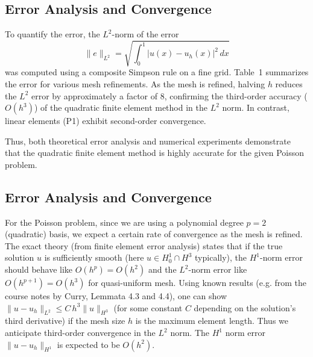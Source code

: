 \documentclass[a4paper,10pt]{article}
\begin{document}
\subsection{Error Analysis and Convergence}
To quantify the error, the \(L^2\)-norm of the error
\[
	\|e\|_{L^2} = \sqrt{\int_0^1 |u(x)-u_h(x)|^2\,dx}
\]
was computed using a composite Simpson rule on a fine grid. Table~1 summarizes the error for various mesh refinements. As the mesh is refined, halving \(h\) reduces the \(L^2\) error by approximately a factor of 8, confirming the third-order accuracy (\(O(h^3)\)) of the quadratic finite element method in the \(L^2\) norm. In contrast, linear elements (P1) exhibit second-order convergence.

Thus, both theoretical error analysis and numerical experiments demonstrate that the quadratic finite element method is highly accurate for the given Poisson problem.

\subsection{Error Analysis and Convergence}
For the Poisson problem, since we are using a polynomial degree \(p=2\) (quadratic) basis, we expect a certain rate of convergence as the mesh is refined.
The exact theory (from finite element error analysis) states that if the true solution \(u\) is sufficiently smooth (here \(u\in H^1_0\cap H^3\) typically), the \(H^1\)-norm error should behave like \(O(h^p) = O(h^2)\) and the \(L^2\)-norm error like \(O(h^{p+1}) = O(h^3)\) for quasi-uniform mesh.
Using known results (e.g. from the course notes by Curry, Lemmata 4.3 and 4.4), one can show \(\|u - u_h\|_{L^2} \le C\,h^3 \|u\|_{H^3}\) (for some constant \(C\) depending on the solution's third derivative) if the mesh size \(h\) is the maximum element length. Thus we anticipate third-order convergence in the \(L^2\) norm. The \(H^1\) norm error \(\|u-u_h\|_{H^1}\) is expected to be \(O(h^2)\).
\end{document}
